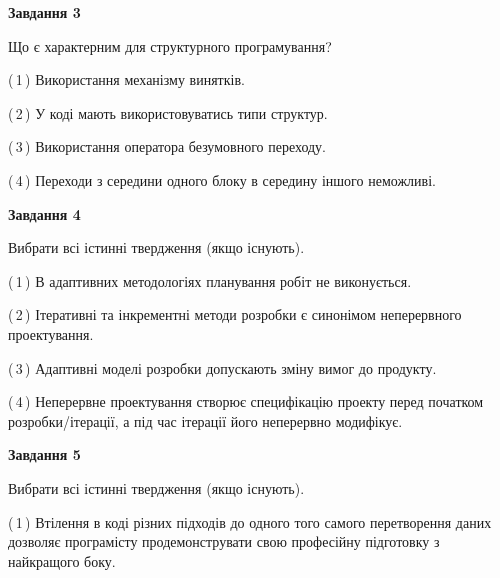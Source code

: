 \documentclass[10pt, ukrainian]{article}
\begin{document}
{\begin {large}
{\begin {center}\textbf{Завдання 3}\end {center}}\par
Що є характерним для структурного програмування?\par
\vspace{2mm}



(\,1\,) Використання механізму винятків. %



(\,2\,) У коді мають використовуватись типи структур. %



(\,3\,) Використання оператора безумовного переходу. %



(\,4\,) Переходи з середини одного блоку в середину іншого неможливі. %


{\begin {center}\textbf{Завдання 4}\end {center}}\par
Вибрати всі істинні твердження (якщо існують).\par
\vspace{2mm}



(\,1\,) В адаптивних методологіях планування робіт не виконується. %



(\,2\,) Ітеративні та інкрементні методи розробки є синонімом неперервного проектування. %



(\,3\,) Адаптивні моделі розробки допускають зміну вимог до продукту. %



(\,4\,) Неперервне проектування створює специфікацію проекту перед початком розробки/ітерації, а під час ітерації його неперервно модифікує.%


{\begin {center}\textbf{Завдання 5}\end {center}}\par
Вибрати всі істинні твердження (якщо існують).\par
\vspace{2mm}



(\,1\,) Втілення в коді різних підходів до одного того самого перетворення даних дозволяє програмісту продемонструвати свою професійну підготовку з найкращого боку. %




\end{large}}
\end{document}
